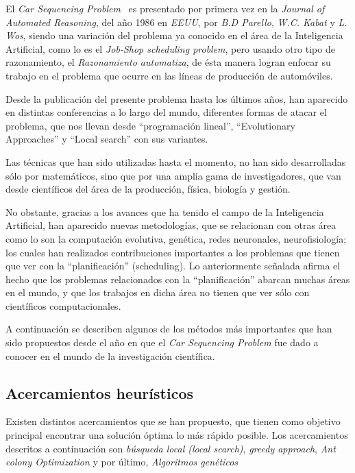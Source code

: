 El \emph{Car Sequencing Problem}~\cite{parello} es presentado por primera vez en la \emph{Journal of Automated Reasoning},
del año 1986 en \emph{EEUU}, por \emph{B.D Parello}, \emph{W.C. Kabat} y \emph{L. Wos}, siendo una variación
del problema ya conocido en el área de la Inteligencia Artificial, como lo es el \emph{Job-Shop scheduling problem},
pero usando otro tipo de razonamiento, el \emph{Razonamiento automatiza}, de ésta manera logran enfocar su trabajo
en el problema que ocurre en las líneas de producción de automóviles.

Desde la publicación del presente problema hasta los últimos años, han aparecido en distintas conferencias a lo largo
del mundo, diferentes formas de atacar el problema, que nos llevan desde  ``programación lineal'', ``Evolutionary Approaches''
y ``Local search'' con sus variantes.

Las técnicas que han sido utilizadas hasta el momento, no han sido desarrolladas sólo por matemáticos, sino que por una amplia
gama de investigadores, que van desde científicos del área de la producción, física, biología y gestión.

No obstante, gracias a los avances que ha tenido el campo de la Inteligencia Artificial, han aparecido nuevas metodologías,
que se relacionan con otras área como lo son la computación evolutiva, genética,  redes neuronales, neurofisiología;
los cuales han realizados contribuciones importantes a los problemas que tienen que ver con la ``planificación'' (scheduling).
Lo anteriormente señalada afirma el hecho que los problemas relacionados con la ``planificación'' abarcan muchas áreas en el mundo,
y que los trabajos en dicha área no tienen que ver sólo con científicos computacionales.

A continuación se describen algunos de los métodos más importantes que han sido propuestos desde el año
en que el \emph{Car Sequencing Problem} fue dado a conocer en el mundo de la investigación científica.


\subsection{Acercamientos heurísticos}
Existen distintos acercamientos que se han propuesto, que tienen como objetivo principal
encontrar una solución óptima lo más rápido posible.
Los acercamientos descritos a continuación son \emph{búsqueda local (local search)},
\emph{greedy approach}, \emph{Ant colony Optimization} y por último, \emph{Algoritmos genéticos}

